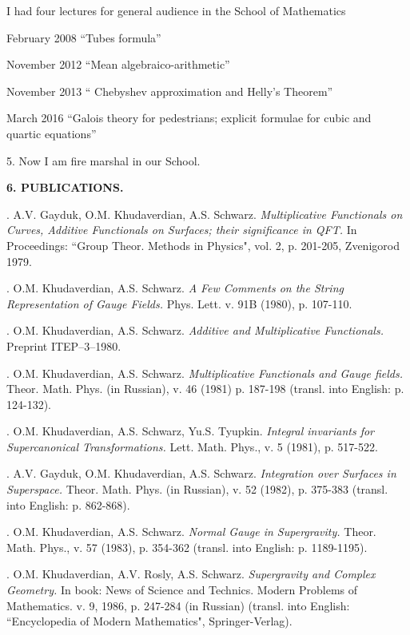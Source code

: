 \documentclass[12pt]{article}
\begin{document}
       I had four lectures for general audience 
      in the School of Mathematics
    
        February 2008 ``Tubes formula''

       November 2012    ``Mean algebraico-arithmetic''

       November 2013    
`` Chebyshev approximation and Helly's Theorem''

       March  2016
``Galois theory for pedestrians; explicit formulae
for cubic and quartic equations''

  5. Now I am fire marshal in our School.
   \begin{center}
    \large \bf 6. PUBLICATIONS.
   \end{center}

. A.V. Gayduk, O.M. Khudaverdian, A.S. Schwarz.
{\it Multiplicative Functionals
   on Curves, Additive Functionals on Surfaces; their significance in QFT.}
     In  Proceedings: ``Group Theor. Methods in Physics",
      vol. 2, p. 201-205, Zvenigorod 1979.

. O.M. Khudaverdian, A.S. Schwarz.
{\it A Few Comments on the String Representation
      of Gauge Fields.}  Phys. Lett. v. 91B (1980), p. 107-110.

. O.M. Khudaverdian, A.S. Schwarz.
  {\it Additive and Multiplicative Functionals.}
             Preprint ITEP--3--1980.

. O.M. Khudaverdian, A.S. Schwarz.
   {\it Multiplicative Functionals and  Gauge fields.} Theor. Math. Phys.
  (in Russian), v. 46 (1981) p. 187-198
                 (transl. into English: p. 124-132).

. O.M. Khudaverdian, A.S. Schwarz, Yu.S. Tyupkin.
{\it Integral invariants for Supercanonical Transformations.}
 Lett. Math. Phys., v. 5 (1981), p. 517-522.

. A.V. Gayduk, O.M. Khudaverdian, A.S. Schwarz.
{\it Integration over Surfaces in  Superspace.}
 Theor. Math. Phys. (in Russian), v. 52 (1982), p. 375-383
           (transl. into English: p. 862-868).

. O.M. Khudaverdian, A.S. Schwarz.
 {\it Normal Gauge in Supergravity.}
           Theor. Math. Phys., v. 57 (1983), p. 354-362
           (transl. into English: p. 1189-1195).

. O.M. Khudaverdian, A.V. Rosly, A.S. Schwarz.
  {\it Supergravity and Complex Geometry.}  In  book:
 News of Science and Technics.
   Modern Problems of Mathematics. v. 9, 1986,
   p. 247-284 (in Russian)
   (transl. into English: ``Encyclopedia
  of Modern Mathematics", Springer-Verlag).
\end{document}
